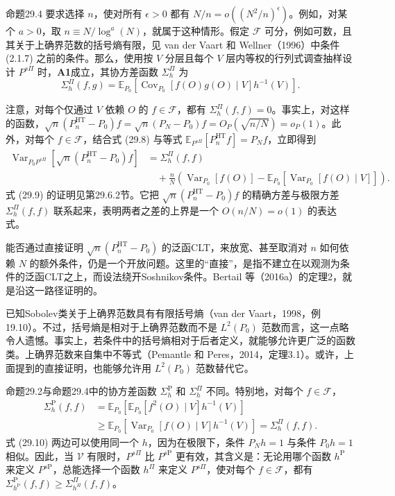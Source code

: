 \begin{bookresult}{命题}{29.4}
要求选择 $n$，使对所有 $\epsilon>0$ 都有 $N/n=o((N^2/n)^\epsilon)$。例如，对某个 $a>0$，取 $n\equiv N/\log^a(N)$，就属于这种情形。假定 $\mathcal F$ 可分，例如可数，且其关于上确界范数的括号熵有限，见 van der Vaart 和 Wellner（1996）中条件 (2.1.7) 之前的条件。那么，使用按 $V$ 分层且每个 $V$ 层内等权的行列式调查抽样设计 $P^{s\Pi}$ 时，\textbf{A1}成立，其协方差函数 $\Sigma_h^\Pi$ 为
\[
\Sigma_h^\Pi(f,g)=\mathbb E_{P_0}\!\left[\operatorname{Cov}_{P_0}[f(O)g(O)\mid V]h^{-1}(V)\right].
\]
\end{bookresult}

注意，对每个仅通过 $V$ 依赖 $O$ 的 $f\in\mathcal F$，都有 $\Sigma_h^\Pi(f,f)=0$。事实上，对这样的函数，$\sqrt n(P_n^{\mathrm{HT}}-P_0)f=\sqrt n(P_N-P_0)f=O_P(\sqrt{n/N})=o_P(1)$。此外，对每个 $f\in\mathcal F$，结合式 (29.8) 与等式 $\mathbb E_{P^{s\Pi}}[P_n^{\mathrm{HT}}f]=P_Nf$，立即得到
\begin{equation}
\begin{aligned}
\operatorname{Var}_{P_0P^{s\Pi}}\!\left[\sqrt n(P_n^{\mathrm{HT}}-P_0)f\right]
&=\Sigma_h^\Pi(f,f)\\
&\quad+\frac nN\left(\operatorname{Var}_{P_0}[f(O)]
-\mathbb E_{P_0}\!\left[\operatorname{Var}_{P_0}[f(O)\mid V]\right]\right).
\end{aligned}
\tag{29.9}
\end{equation}
式 (29.9) 的证明见第29.6.2节。它把 $\sqrt n(P_n^{\mathrm{HT}}-P_0)f$ 的精确方差与极限方差 $\Sigma_h^\Pi(f,f)$ 联系起来，表明两者之差的上界是一个 $O(n/N)=o(1)$ 的表达式。

能否通过直接证明 $\sqrt n(P_n^{\mathrm{HT}}-P_0)$ 的泛函CLT，来放宽、甚至取消对 $n$ 如何依赖 $N$ 的额外条件，仍是一个开放问题。这里的“直接”，是指不建立在以观测为条件的泛函CLT之上，而设法绕开Soshnikov条件。Bertail 等（2016a）的定理2，就是沿这一路径证明的。

已知Sobolev类关于上确界范数具有有限括号熵（van der Vaart，1998，例19.10）。不过，括号熵是相对于上确界范数而不是 $L^2(P_0)$ 范数而言，这一点略令人遗憾。事实上，若条件中的括号熵相对于后者定义，就能够允许更广泛的函数类。上确界范数来自集中不等式（Pemantle 和 Peres，2014，定理3.1）。或许，上面提到的直接证明，也能够允许用 $L^2(P_0)$ 范数替代它。

命题29.2与命题29.4中的协方差函数 $\Sigma_h^{\mathrm P}$ 和 $\Sigma_h^\Pi$ 不同。特别地，对每个 $f\in\mathcal F$，
\begin{equation}
\begin{aligned}
\Sigma_h^{\mathrm P}(f,f)
&=\mathbb E_{P_0}\!\left[\mathbb E_{P_0}[f^2(O)\mid V]h^{-1}(V)\right]\\
&\ge\mathbb E_{P_0}\!\left[\operatorname{Var}_{P_0}[f(O)\mid V]h^{-1}(V)\right]
=\Sigma_h^\Pi(f,f).
\end{aligned}
\tag{29.10}
\end{equation}
式 (29.10) 两边可以使用同一个 $h$，因为在极限下，条件 $P_Nh=1$ 与条件 $P_0h=1$ 相似。因此，当 $\mathcal V$ 有限时，$P^{s\Pi}$ 比 $P^{s\mathrm P}$ 更有效，其含义是：无论用哪个函数 $h^{\mathrm P}$ 来定义 $P^{s\mathrm P}$，总能选择一个函数 $h^\Pi$ 来定义 $P^{s\Pi}$，使对每个 $f\in\mathcal F$，都有 $\Sigma_{h^{\mathrm P}}^{\mathrm P}(f,f)\ge\Sigma_{h^\Pi}^\Pi(f,f)$。

